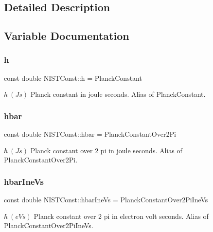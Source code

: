 \subsection{Detailed Description}


\subsection{Variable Documentation}
\mbox{\label{group___planck_constant_ga772638524d12d0e8a63abb25441f87a9}} 
\subsubsection{\texorpdfstring{h}{h}}
{\footnotesize\ttfamily const double N\+I\+S\+T\+Const\+::h = Planck\+Constant}

$h \ (J s)$ Planck constant in joule seconds. Alias of Planck\+Constant. \mbox{\label{group___planck_constant_gaec21867afdeb1950b150e667513cd842}} 
\subsubsection{\texorpdfstring{hbar}{hbar}}
{\footnotesize\ttfamily const double N\+I\+S\+T\+Const\+::hbar = Planck\+Constant\+Over2\+Pi}

$\hbar \ (J s)$ Planck constant over 2 pi in joule seconds. Alias of Planck\+Constant\+Over2\+Pi. \mbox{\label{group___planck_constant_gacbb39d7d0090ed14cb725a1d6eaa3fd3}} 
\subsubsection{\texorpdfstring{hbar\+Ine\+Vs}{hbarIneVs}}
{\footnotesize\ttfamily const double N\+I\+S\+T\+Const\+::hbar\+Ine\+Vs = Planck\+Constant\+Over2\+Pi\+Ine\+Vs}

$\hbar \ (eV s)$ Planck constant over 2 pi in electron volt seconds. Alias of Planck\+Constant\+Over2\+Pi\+Ine\+Vs. \mbox{\label{group___planck_constant_ga58501029ba9f6b757d6d9992dfb56b4f}} 
